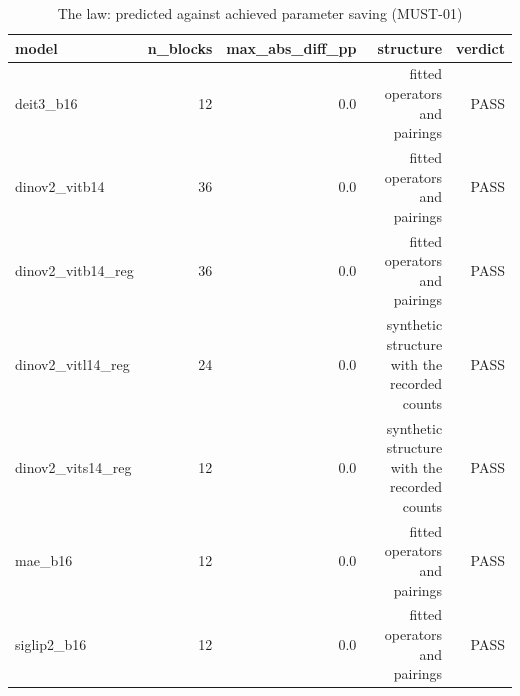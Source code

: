 \begin{table}[t]
\centering
\small
\caption{The law: predicted against achieved parameter saving (MUST-01)}
\label{tab:appendix_a2_law}
\begin{tabular}{lrrrr}
\toprule
model & n\_blocks & max\_abs\_diff\_pp & structure & verdict \\
\midrule
deit3\_b16 & 12 & 0.0 & fitted operators and pairings & PASS \\
dinov2\_vitb14 & 36 & 0.0 & fitted operators and pairings & PASS \\
dinov2\_vitb14\_reg & 36 & 0.0 & fitted operators and pairings & PASS \\
dinov2\_vitl14\_reg & 24 & 0.0 & synthetic structure with the recorded counts & PASS \\
dinov2\_vits14\_reg & 12 & 0.0 & synthetic structure with the recorded counts & PASS \\
mae\_b16 & 12 & 0.0 & fitted operators and pairings & PASS \\
siglip2\_b16 & 12 & 0.0 & fitted operators and pairings & PASS \\
\bottomrule
\end{tabular}
\end{table}
